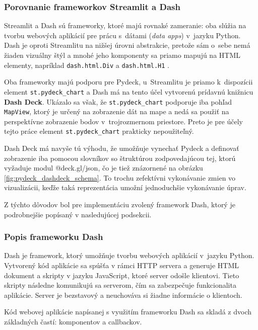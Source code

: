 \subsubsection{Porovnanie frameworkov Streamlit a Dash}

Streamlit a Dash sú frameworky, ktoré majú rovnaké zameranie: oba slúžia na tvorbu webových aplikácií pre prácu s~dátami (\emph{data apps}) v~jazyku Python. Dash je oproti Streamlitu na nižšej úrovni abstrakcie, pretože sám o~sebe nemá žiaden vizuálny štýl a mnohé jeho komponenty sa priamo mapujú na HTML elementy, napríklad \texttt{dash.html.Div} a \texttt{dash.html.H1} \cite{dash_documentation, streamlit_documentation}.

Oba frameworky majú podporu pre Pydeck, u~Streamlitu je priamo k~dispozícii element \texttt{st.pydeck\_chart} a Dash má na tento účel vytvorenú prídavnú knižnicu \textbf{Dash Deck}. Ukázalo sa však, že \texttt{st.pydeck\_chart} podporuje iba pohľad \texttt{MapView}, ktorý je určený na zobrazenie dát na mape a nedá sa použiť na perspektívne zobrazenie bodov v~trojrozmernom priestore. Preto je pre účely tejto práce element \texttt{st.pydeck\_chart} prakticky nepoužiteľný.

Dash Deck má navyše tú výhodu, že umožňuje vynechať Pydeck a definovať zobrazenie iba pomocou slovníkov so štruktúrou zodpovedajúcou tej, ktorú vyžaduje modul @deck.gl/json, čo je tiež znázornené na obrázku \ref{fig:pydeck_dashdeck_schema}. To trochu zefektívni vykonávanie zmien vo vizualizácii, keďže taká reprezentácia umožní jednoduchšie vykonávanie úprav.

Z týchto dôvodov bol pre implementáciu zvolený framework Dash, ktorý je podrobnejšie popísaný v nasledujúcej podsekcii.

\subsubsection{Popis frameworku Dash}

Dash je framework, ktorý umožňuje tvorbu webových aplikácií v~jazyku Python. Vytvorený kód aplikácie sa spúšťa v rámci HTTP servera a generuje HTML dokument a skripty v jazyku JavaScript, ktoré server odošle klientovi. Tieto skripty následne komunikujú sa serverom, čím sa zabezpečuje funkcionalita aplikácie. Server je bezstavový a neuchováva si žiadne informácie o klientoch.

Kód webovej aplikácie napísanej s využitím frameworku Dash sa skladá z dvoch základných častí: komponentov a callbackov.

